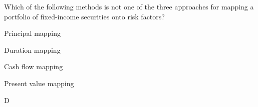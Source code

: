 \documentclass{article}
\newcounter{question} %
\begin{document}
\begin{question}
    Which of the following methods is not one of the three approaches for mapping a portfolio of fixed-income securities onto risk factors?
\end{question}

\begin{choices}
    \item Principal mapping
    \item Duration mapping
    \item Cash flow mapping
    \item Present value mapping
\end{choices}

\begin{correctanswer}
    D
\end{correctanswer}
\end{document}
